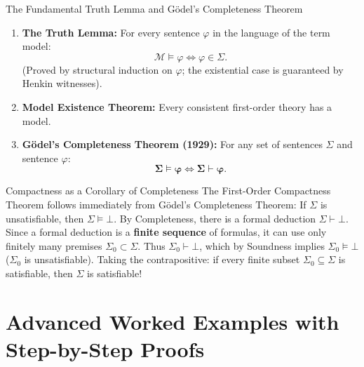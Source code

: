 \begin{theorembox}{The Fundamental Truth Lemma and G\"odel's Completeness Theorem}
\begin{enumerate}[leftmargin=1.4em,itemsep=3pt]
  \item \textbf{The Truth Lemma:} For every sentence $\varphi$ in the language of the term model:
  \[
  \mathcal{M} \models \varphi \iff \varphi \in \Sigma.
  \]
  (Proved by structural induction on $\varphi$; the existential case is guaranteed by Henkin witnesses).
  \item \textbf{Model Existence Theorem:} Every consistent first-order theory has a model.
  \item \textbf{G\"odel's Completeness Theorem (1929):} For any set of sentences $\Sigma$ and sentence $\varphi$:
  \[
  \mathbf{\Sigma \models \varphi \iff \Sigma \vdash \varphi}.
  \]
\end{enumerate}
\end{theorembox}

\begin{propbox}{Compactness as a Corollary of Completeness}
The First-Order Compactness Theorem follows immediately from G\"odel's Completeness Theorem:
If $\Sigma$ is unsatisfiable, then $\Sigma \models \bot$.
By Completeness, there is a formal deduction $\Sigma \vdash \bot$.
Since a formal deduction is a \textbf{finite sequence} of formulas, it can use only finitely many premises $\Sigma_0 \subset \Sigma$.
Thus $\Sigma_0 \vdash \bot$, which by Soundness implies $\Sigma_0 \models \bot$ ($\Sigma_0$ is unsatisfiable).
Taking the contrapositive: if every finite subset $\Sigma_0 \subseteq \Sigma$ is satisfiable, then $\Sigma$ is satisfiable!
\end{propbox}

\section{Advanced Worked Examples with Step-by-Step Proofs}

